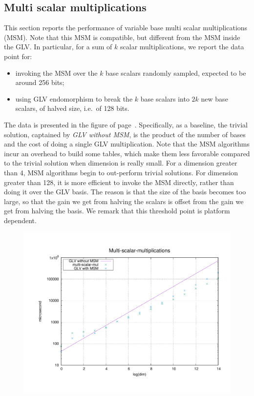 \documentclass[smallextended]{svjour3}
\begin{document}
\subsection{Multi scalar multiplications}
This section reports the performance of variable base 
multi scalar multiplications (MSM). Note that this MSM is 
compatible, but
different
from the MSM inside the GLV. 
In particular, for a sum of $k$ scalar multiplications,
we report the data point for: 
\begin{itemize}
  \item invoking the MSM over the $k$ base scalars randomly sampled,
    expected to be around 256 bits;
  \item using GLV endomorphism to break the $k$ base scalars into $2k$
    new base scalars, of halved size, i.e.~of 128 bits.
\end{itemize}
The data is presented in the figure of page~\pageref{fig:msm}. Specifically, 
as a baseline, the trivial solution, captained by 
{\em GLV without 
MSM}, is the product of the number of bases and the cost of
doing a single GLV multiplication. 
Note that the MSM algorithms incur an overhead to build some
tables, which make them less favorable compared to the trivial
solution when dimension is really small. For a dimension greater 
than 4, MSM algorithms begin to out-perform trivial solutions.
For dimension greater than 128, it is more efficient to 
invoke the MSM directly, rather than doing it over the GLV basis.
The reason is that the size of the basis becomes too large, so
that the gain we get from halving the scalars is offset from the
gain we get from halving the basis. We remark that this threshold
point is platform dependent.
\begin{figure}[h]\label{fig:msm}\centering 
  \includegraphics[width=12cm]{fig/msm.pdf}
\end{figure}
\end{document}

